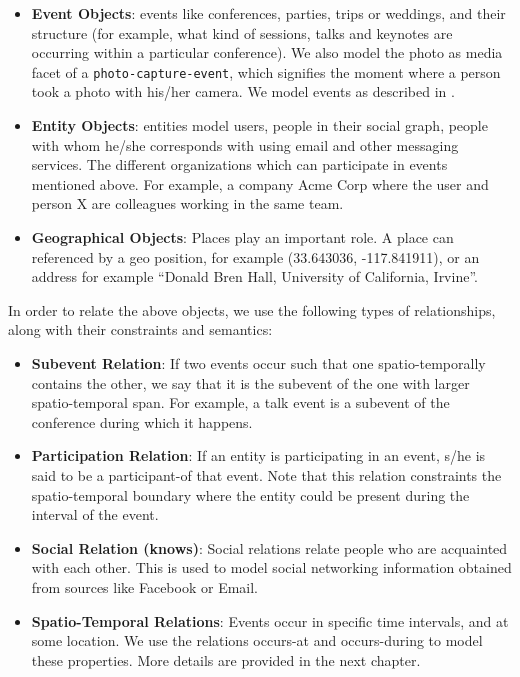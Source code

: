 \begin{itemize}
\item \textbf{Event Objects}: events like conferences, parties, trips or weddings, and their structure (for example, what kind of sessions, talks and keynotes are occurring within a particular conference). We also model the photo as media facet of a \texttt{photo-capture-event}, which signifies the moment where a person took a photo with his/her camera. We model events as described in \cite{gupta2011managing, westermann2007toward}.

\item \textbf{Entity Objects}: entities model users, people in their social graph, people with whom he/she corresponds with using email and other messaging services. The different organizations which can participate in events mentioned above. For example, a company Acme Corp where the user and person X are colleagues working in the same team.

\item \textbf{Geographical Objects}: Places play an important role. A place can referenced by a geo position, for example (33.643036, -117.841911), or an address for example ``Donald Bren Hall, University of California, Irvine''. 
\end{itemize}

In order to relate the above objects, we use the following types of relationships, along with their constraints and semantics:

\begin{itemize}
\item \textbf{Subevent Relation}: If two events occur such that one spatio-temporally contains the other, we say that it is the subevent \cite{gupta2011managing} of the one with larger spatio-temporal span. For example, a talk event is a subevent of the conference during which it happens.

\item \textbf{Participation Relation}: If an entity is participating in an event, s/he is said to be a participant-of that event. Note that this relation constraints the spatio-temporal boundary where the entity could be present during the interval of the event.

\item \textbf{Social Relation (knows)}: Social relations relate people who are acquainted with each other. This is used to model social networking information obtained from sources like Facebook or Email.

\item \textbf{Spatio-Temporal Relations}: Events occur in specific time intervals, and at some location. We use the relations occurs-at and occurs-during to model these properties. More details are provided in the next chapter.
\end{itemize}

